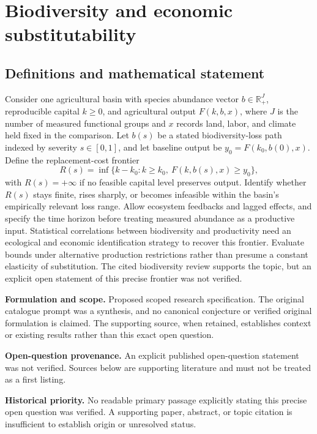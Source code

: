 \documentclass[11pt]{article}
\begin{document}
\section*{Biodiversity and economic substitutability}\label{30007718}
\subsection{Definitions and mathematical statement}
Consider one agricultural basin with species abundance vector \(b\in\mathbb R_+^J\), reproducible capital \(k\geq0\), and agricultural output \(F(k,b,x)\), where \(J\) is the number of measured functional groups and \(x\) records land, labor, and climate held fixed in the comparison. Let \(b(s)\) be a stated biodiversity-loss path indexed by severity \(s\in[0,1]\), and let baseline output be \(y_0=F(k_0,b(0),x)\). Define the replacement-cost frontier
\[R(s)=\inf\{k-k_0:k\geq k_0,\ F(k,b(s),x)\geq y_0\},\]
with \(R(s)=+\infty\) if no feasible capital level preserves output. Identify whether \(R(s)\) stays finite, rises sharply, or becomes infeasible within the basin’s empirically relevant loss range. Allow ecosystem feedbacks and lagged effects, and specify the time horizon before treating measured abundance as a productive input. Statistical correlations between biodiversity and productivity need an ecological and economic identification strategy to recover this frontier. Evaluate bounds under alternative production restrictions rather than presume a constant elasticity of substitution. The cited biodiversity review supports the topic, but an explicit open statement of this precise frontier was not verified.

\par\textbf{Formulation and scope.} Proposed scoped research specification. The original catalogue prompt was a synthesis, and no canonical conjecture or verified original formulation is claimed. The supporting source, when retained, establishes context or existing results rather than this exact open question.

\par\textbf{Open-question provenance.} An explicit published open-question statement was not verified. Sources below are supporting literature and must not be treated as a first listing.

\par\textbf{Historical priority.} No readable primary passage explicitly stating this precise open question was verified. A supporting paper, abstract, or topic citation is insufficient to establish origin or unresolved status.
\end{document}

